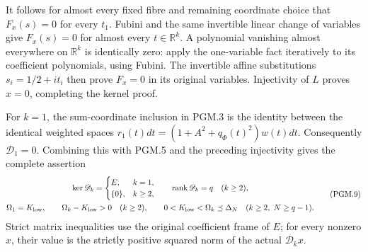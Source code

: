 It follows for almost every fixed fibre and remaining coordinate
choice that \(F_x(s)=0\) for every \(t_1\). Fubini and the same
invertible linear change of variables give \(F_x(s)=0\) for
almost every \(t\in\mathbb R^k\). A polynomial vanishing almost
everywhere on \(\mathbb R^k\) is identically zero: apply the
one-variable fact iteratively to its coefficient polynomials,
using Fubini. The invertible affine substitutions
\(s_i=1/2+it_i\) then prove \(F_x=0\) in its original variables.
Injectivity of \(L\) proves \(x=0\), completing the kernel proof.

For \(k=1\), the sum-coordinate inclusion in PGM.3 is the
identity between the identical weighted spaces
\(r_1(t)dt=(1+A^2+q_\Phi(t)^2)w(t)dt\).
Consequently \(\mathscr D_1=0\). Combining this with PGM.5
and the preceding injectivity gives the complete assertion
\[
\begin{gathered}
 \ker\mathscr D_k=
 \begin{cases}E,&k=1,\\ \{0\},&k\geq2,\end{cases}
 \qquad
 \operatorname{rank}\mathscr D_k=q\quad(k\geq2),\\
 \Omega_1=K_{\rm low},\qquad
 \Omega_k-K_{\rm low}>0\quad(k\geq2),\qquad
 0<K_{\rm low}<\Omega_k\preceq\Delta_N
          \quad(k\geq2,\ N\geq q-1).
\end{gathered}
\tag{PGM.9}\label{eq:pgm-strict}
\]
Strict matrix inequalities use the original coefficient frame of
\(E\); for every nonzero \(x\), their value is the strictly
positive squared norm of the actual \(\mathscr D_kx\).

